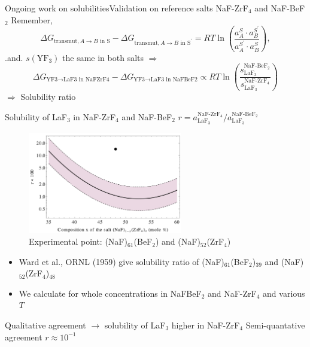 \documentclass{beamer}
\begin{document}
\begin{frame}{Ongoing work on solubilities}{Validation on reference salts NaF-ZrF$_4$ and NaF-BeF$_2$}
    Remember,
    \begin{equation}
        \Delta G_{\text{transmut},A\rightarrow B\text{ in S}} - \Delta G_{\text{transmut},A\rightarrow B\text{ in S}^{\prime}} = RT \ln\left(\frac{a_A^S\cdot a_B^{S^\prime}}{a_A^{S^{\prime}}\cdot a_B^S}\right),   \nonumber
    \end{equation}
    .and. $s(\text{YF}_3)$ the same in both salts $\Rightarrow $
    \begin{equation}
        \Delta G_{\text{YF3}\rightarrow\text{LaF3 in NaFZrF4}} - \Delta G_{\text{YF3}\rightarrow\text{LaF3 in NaFBeF2}} \propto RT \ln\left(\frac{s_{\text{LaF}_3}^{\text{NaF-BeF}_2}}{s_{\text{LaF}_3}^{\text{NaF-ZrF}_4}}\right) \nonumber
    \end{equation}
    $\Rightarrow$ Solubility ratio
\end{frame}
\begin{frame}{Solubility of LaF$_3$ in NaF-ZrF$_4$ and NaF-BeF$_2$}
    $ r = a_{\text{LaF}_3}^{\text{NaF-ZrF}_4} / a_{\text{LaF}_3}^{\text{NaF-BeF}_2} $
    \begin{figure}
        \includegraphics[width=0.6\textwidth]{deducted_solubilities}
        \caption{Experimental point: (NaF)$_{61}$(BeF$_2$) and (NaF)$_{52}$(ZrF$_4$)}
    \end{figure}
    \begin{itemize}
        \item Ward et al., ORNL (1959) give solubility ratio of (NaF)$_{61}$(BeF$_2$)$_{39}$ and (NaF)$_{52}$(ZrF$_4$)$_{48}$
        \item We calculate for whole concentrations in NaFBeF$_2$ and NaF-ZrF$_4$ and various $T$
    \end{itemize}
    Qualitative agreement $\rightarrow$ solubility of LaF$_3$ higher in NaF-ZrF$_4$
    Semi-quantative agreement $r\approx 10^{-1}$
\end{frame}
\end{document}
